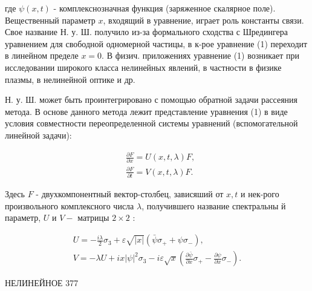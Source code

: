 \documentclass[10pt]{article}
\begin{document}
где $\psi(x, t)$ - комплекснозначная функция (заряженное скалярное поле). Вещественный параметр $x$, входящий в уравнение, играет роль константы связи. Свое название Н. у. Ш. получило из-за формального сходства с Шредингера уравнением для свободной одномерной частицы, в к-рое уравнение (1) переходит в линейном пределе $x=0$. В физич. приложениях уравнение (1) возникает при исследовании широкого класса нелинейных явлений, в частности в физике плазмы, в нелинейной оптике и др.



Н. у. Ш. может быть проинтегрировано с помощью обратной задачи рассеяния метода. В основе данного метода лежит представление уравнения (1) в виде условия совместности переопределенной системы уравнений (вспомогательной линейной задачи):



\[

\begin{aligned}

& \frac{\partial F}{\partial x}=U(x, t, \lambda) F, \\

& \frac{\partial F}{\partial t}=V(x, t, \lambda) F .

\end{aligned}

\]



Здесь $F$ - двухкомпонентный вектор-столбец, зависяший от $x, t$ и нек-рого произвольного комплексного числа $\lambda$, получившего название спектральны й параметр, $U$ и $V-$ матрицы $2 \times 2$ :



\[

\begin{gathered}

U=-\frac{i \lambda}{2} \sigma_{3}+\varepsilon \sqrt{|x|}\left(\bar{\psi} \sigma_{+}+\psi \sigma_{-}\right), \\

V=-\lambda U+i x|\psi|^{2} \sigma_{3}-i \varepsilon \sqrt{x}\left(\frac{\partial \bar{\psi}}{\partial x} \sigma_{+}-\frac{\partial \psi}{\partial x} \sigma_{-}\right) .

\end{gathered}

\]



НЕЛИНЕЙНОЕ 377
\end{document}
